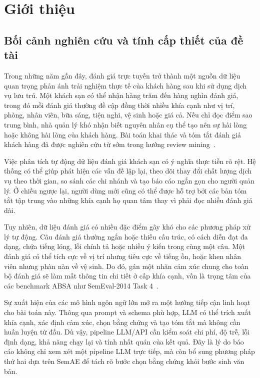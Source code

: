 \documentclass[12pt,a4paper]{report}
\begin{document}
\chapter{Giới thiệu}

\section{Bối cảnh nghiên cứu và tính cấp thiết của đề tài}

Trong những năm gần đây, đánh giá trực tuyến trở thành một nguồn dữ liệu quan trọng phản ánh trải nghiệm thực tế của khách hàng sau khi sử dụng dịch vụ lưu trú. Một khách sạn có thể nhận hàng trăm đến hàng nghìn đánh giá, trong đó mỗi đánh giá thường đề cập đồng thời nhiều khía cạnh như vị trí, phòng, nhân viên, bữa sáng, tiện nghi, vệ sinh hoặc giá cả. Nếu chỉ đọc điểm sao trung bình, nhà quản lý khó nhận biết nguyên nhân cụ thể tạo nên sự hài lòng hoặc không hài lòng của khách hàng. Bài toán khai thác và tóm tắt đánh giá khách hàng đã được nghiên cứu từ sớm trong hướng review mining~\cite{hu2004mining}.

Việc phân tích tự động dữ liệu đánh giá khách sạn có ý nghĩa thực tiễn rõ rệt. Hệ thống có thể giúp phát hiện các vấn đề lặp lại, theo dõi thay đổi chất lượng dịch vụ theo thời gian, so sánh các chi nhánh và tạo báo cáo ngắn gọn cho người quản lý. Ở chiều ngược lại, người dùng mới cũng có thể được hỗ trợ bởi các bản tóm tắt tập trung vào những khía cạnh họ quan tâm thay vì phải đọc nhiều đánh giá dài.

Tuy nhiên, dữ liệu đánh giá có nhiều đặc điểm gây khó cho các phương pháp xử lý tự động. Câu đánh giá thường ngắn hoặc thiếu cấu trúc, có cách diễn đạt đa dạng, chứa tiếng lóng, lỗi chính tả hoặc nhiều ý kiến trong cùng một câu. Một đánh giá có thể tích cực về vị trí nhưng tiêu cực về tiếng ồn, hoặc khen nhân viên nhưng phàn nàn về vệ sinh. Do đó, gán một nhãn cảm xúc chung cho toàn bộ đánh giá sẽ làm mất thông tin chi tiết ở cấp khía cạnh, vốn là trọng tâm của các benchmark ABSA như SemEval-2014 Task 4~\cite{pontiki2014semeval}.

Sự xuất hiện của các mô hình ngôn ngữ lớn mở ra một hướng tiếp cận linh hoạt cho bài toán này. Thông qua prompt và schema phù hợp, LLM có thể trích xuất khía cạnh, xác định cảm xúc, chọn bằng chứng và tạo tóm tắt mà không cần huấn luyện từ đầu. Dù vậy, pipeline LLM/API cần kiểm soát chi phí, độ trễ, lỗi định dạng, khả năng chạy lại và tính nhất quán của kết quả. Đây là lý do báo cáo không chỉ xem xét một pipeline LLM trực tiếp, mà còn bổ sung phương pháp thứ hai dựa trên SemAE để tách rõ bước chọn bằng chứng khỏi bước sinh văn bản.
\end{document}
